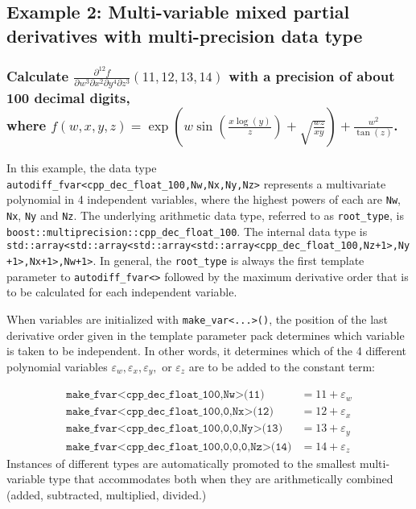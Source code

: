 \documentclass{article}
\begin{document}
\subsection{Example 2: Multi-variable mixed partial derivatives with multi-precision data type}
\subsubsection{Calculate $\frac{\partial^{12}f}{\partial w^{3}\partial x^{2}\partial y^{4}\partial z^{3}}(11,12,13,14)$
with a precision of about 100 decimal digits,\\
where $f(w,x,y,z)=\exp\left(w\sin\left(\frac{x\log(y)}{z}\right)+\sqrt{\frac{wz}{xy}}\right)+\frac{w^2}{\tan(z)}$.}

In this example, the data type {\tt autodiff\_fvar<cpp\_dec\_float\_100,Nw,Nx,Ny,Nz>} represents
a multivariate polynomial in 4 independent variables, where the highest powers of each are {\tt Nw}, {\tt Nx},
{\tt Ny} and {\tt Nz}. The underlying arithmetic data type, referred to as {\tt root\_type}, is
{\tt boost::multiprecision::cpp\_dec\_float\_100}. The internal data type is
{\tt std::array<std::array<std::array<std::array<cpp\_dec\_float\_100,Nz+1>,Ny+1>,Nx+1>,Nw+1>}. In general, the
{\tt root\_type} is always the first template parameter to {\tt autodiff\_fvar<>} followed by the maximum
derivative order that is to be calculated for each independent variable.

When variables are initialized with {\tt make\_var<...>()}, the position of the last derivative order given in
the template parameter pack determines which variable is taken to be independent. In other words, it determines
which of the 4 different polynomial variables $\varepsilon_w,\varepsilon_x,\varepsilon_y,$ or $\varepsilon_z$
are to be added to the constant term:

\begin{align*}
\texttt{make\_fvar<cpp\_dec\_float\_100,Nw>(11)} &= 11+\varepsilon_w \\
\texttt{make\_fvar<cpp\_dec\_float\_100,0,Nx>(12)} &= 12+\varepsilon_x \\
\texttt{make\_fvar<cpp\_dec\_float\_100,0,0,Ny>(13)} &= 13+\varepsilon_y \\
\texttt{make\_fvar<cpp\_dec\_float\_100,0,0,0,Nz>(14)} &= 14+\varepsilon_z
\end{align*}
Instances of different types are automatically promoted to the smallest multi-variable type that accommodates
both when they are arithmetically combined (added, subtracted, multiplied, divided.)
\end{document}
